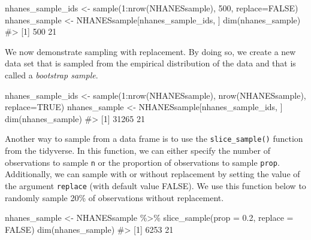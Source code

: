 \documentclass[
  letterpaper,
]{krantz}
\makeatletter
\newenvironment{Shaded}{\begin{snugshade}}{\end{snugshade}}
\newcommand{\AttributeTok}[1]{\textcolor[rgb]{0.40,0.45,0.13}{#1}}
\newcommand{\CommentTok}[1]{\textcolor[rgb]{0.37,0.37,0.37}{#1}}
\newcommand{\ConstantTok}[1]{\textcolor[rgb]{0.56,0.35,0.01}{#1}}
\newcommand{\DecValTok}[1]{\textcolor[rgb]{0.68,0.00,0.00}{#1}}
\newcommand{\FloatTok}[1]{\textcolor[rgb]{0.68,0.00,0.00}{#1}}
\newcommand{\FunctionTok}[1]{\textcolor[rgb]{0.28,0.35,0.67}{#1}}
\newcommand{\NormalTok}[1]{\textcolor[rgb]{0.00,0.23,0.31}{#1}}
\newcommand{\OtherTok}[1]{\textcolor[rgb]{0.00,0.23,0.31}{#1}}
\newcommand{\SpecialCharTok}[1]{\textcolor[rgb]{0.37,0.37,0.37}{#1}}
\newenvironment{kframe}{%
\medskip{}
\setlength{\fboxsep}{.8em}
 \def\at@end@of@kframe{}%
 \ifinner\ifhmode%
  \def\at@end@of@kframe{\end{minipage}}%
  \begin{minipage}{\columnwidth}%
 \fi\fi%
 \def\FrameCommand##1{\hskip\@totalleftmargin \hskip-\fboxsep
 \colorbox{shadecolor}{##1}\hskip-\fboxsep
     \hskip-\linewidth \hskip-\@totalleftmargin \hskip\columnwidth}%
 \MakeFramed {\advance\hsize-\width
   \@totalleftmargin\z@ \linewidth\hsize
   \@setminipage}}%
 {\par\unskip\endMakeFramed%
 \at@end@of@kframe}
\renewenvironment{Shaded}{\begin{kframe}}{\end{kframe}}
\makeatother
\begin{document}
\begin{Shaded}
\begin{Highlighting}[]
\NormalTok{nhanes\_sample\_ids }\OtherTok{\textless{}{-}} \FunctionTok{sample}\NormalTok{(}\DecValTok{1}\SpecialCharTok{:}\FunctionTok{nrow}\NormalTok{(NHANESsample), }\DecValTok{500}\NormalTok{, }\AttributeTok{replace=}\ConstantTok{FALSE}\NormalTok{)}
\NormalTok{nhanes\_sample }\OtherTok{\textless{}{-}}\NormalTok{ NHANESsample[nhanes\_sample\_ids, ]}
\FunctionTok{dim}\NormalTok{(nhanes\_sample)}
\CommentTok{\#\textgreater{} [1] 500  21}
\end{Highlighting}
\end{Shaded}

We now demonstrate sampling with replacement. By doing so, we create a
new data set that is sampled from the empirical distribution of the data
and that is called a \emph{bootstrap sample}.

\begin{Shaded}
\begin{Highlighting}[]
\NormalTok{nhanes\_sample\_ids }\OtherTok{\textless{}{-}} \FunctionTok{sample}\NormalTok{(}\DecValTok{1}\SpecialCharTok{:}\FunctionTok{nrow}\NormalTok{(NHANESsample), }\FunctionTok{nrow}\NormalTok{(NHANESsample), }
                            \AttributeTok{replace=}\ConstantTok{TRUE}\NormalTok{)}
\NormalTok{nhanes\_sample }\OtherTok{\textless{}{-}}\NormalTok{ NHANESsample[nhanes\_sample\_ids, ]}
\FunctionTok{dim}\NormalTok{(nhanes\_sample)}
\CommentTok{\#\textgreater{} [1] 31265    21}
\end{Highlighting}
\end{Shaded}

Another way to sample from a data frame is to use the
\texttt{slice\_sample()} function from the tidyverse. In this function,
we can either specify the number of observations to sample \texttt{n} or
the proportion of observations to sample \texttt{prop}. Additionally, we
can sample with or without replacement by setting the value of the
argument \texttt{replace} (with default value FALSE). We use this
function below to randomly sample 20\% of observations without
replacement.

\begin{Shaded}
\begin{Highlighting}[]
\NormalTok{nhanes\_sample }\OtherTok{\textless{}{-}}\NormalTok{ NHANESsample }\SpecialCharTok{\%\textgreater{}\%}
  \FunctionTok{slice\_sample}\NormalTok{(}\AttributeTok{prop =} \FloatTok{0.2}\NormalTok{, }\AttributeTok{replace =} \ConstantTok{FALSE}\NormalTok{)}
\FunctionTok{dim}\NormalTok{(nhanes\_sample)}
\CommentTok{\#\textgreater{} [1] 6253   21}
\end{Highlighting}
\end{Shaded}
\end{document}
